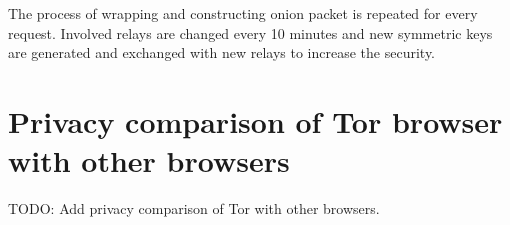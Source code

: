 \documentclass{article}
\begin{document}
      The process of wrapping and constructing onion packet is repeated for
      every request. Involved relays are changed every 10 minutes and new
      symmetric keys are generated and exchanged with new relays to increase
      the security.

    \section{Privacy comparison of Tor browser with other browsers}
      TODO: Add privacy comparison of Tor with other browsers.
\end{document}
